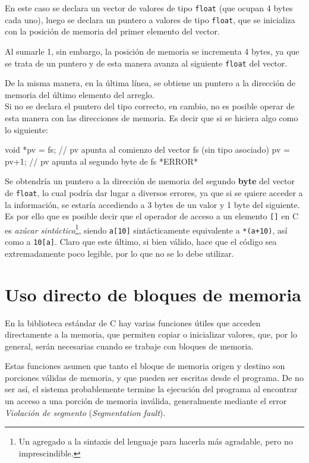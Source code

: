 En este caso se declara un vector de valores de tipo \lstinline!float! (que
ocupan 4 bytes cada uno), luego se declara un puntero a valores de tipo
\lstinline!float!, que se inicializa con la posición de memoria del primer
elemento del vector.

Al sumarle 1, sin embargo, la posición de memoria se incrementa 4 bytes, ya
que se trata de un puntero y de esta manera avanza al siguiente
\lstinline!float! del vector.

De la misma manera, en la última línea, se obtiene un puntero a la dirección
de memoria del último elemento del arreglo. \\

Si no se declara el puntero del tipo correcto, en cambio, no es posible operar
de esta manera con las direcciones de memoria.  Es decir que si se hiciera
algo como lo siguiente:

\begin{codigo-c-plano}
void *pv = fs;  // pv apunta al comienzo del vector fs (sin tipo asociado)
pv = pv+1;      // pv apunta al segundo byte de fs *ERROR*
\end{codigo-c-plano}

Se obtendría un puntero a la dirección de memoria del segundo \textbf{byte}
del vector de \lstinline!float!, lo cual podría dar lugar a diversos errores,
ya que si se quiere acceder a la información, se estaría accediendo a 3 bytes
de un valor y 1 byte del siguiente. \\

Es por ello que es posible decir que el operador de acceso a un elemento
\lstinline![]! en C es \textit{azúcar sintáctico}\footnote{Un agregado a la
sintaxis del lenguaje para hacerla más agradable, pero no imprescindible.},
siendo \lstinline!a[10]! sintácticamente equivalente a \lstinline!*(a+10)!,
así como a \lstinline!10[a]!. Claro que este último, si bien válido, hace que
el código sea extremadamente poco legible, por lo que no se lo debe utilizar.

\section{Uso directo de bloques de memoria}

En la biblioteca estándar de C hay varias funciones útiles que acceden
directamente a la memoria, que permiten copiar o inicializar valores, que,
por lo general, serán necesarias cuando se trabaje con bloques de memoria.

Estas funciones asumen que tanto el bloque de memoria origen y destino son
porciones válidas de memoria, y que pueden ser escritas desde el programa.  De
no ser así, el sistema probablemente termine la ejecución del programa al
encontrar un acceso a una porción de memoria inválida, generalmente mediante
el error \textit{Violación de segmento} (\textit{Segmentation fault}).

